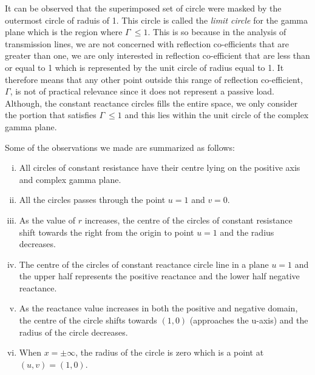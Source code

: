 It can be observed that the superimposed set of circle were masked by the outermost circle of raduis of 1. This circle is called the \emph{limit circle} for the gamma plane which is the region where $\Gamma\ \leq 1$. This is so because in the analysis of transmission lines, we are not concerned with reflection co-efficients that are greater than one, we are only interested in reflection co-efficient that are less than or equal to 1 which is represented by the unit circle of radius equal to 1. It therefore means that any other point outside this range of reflection co-efficient, $\Gamma$, is not of practical relevance since it does not represent a passive load. Although, the constant reactance circles fills the entire space, we only consider the portion that satisfies $ \Gamma\ \leq 1$ and this lies within the unit circle of the complex gamma plane.

Some of the observations we made are summarized as follows:
\begin{enumerate}[(i)]
\item All circles of constant resistance have their centre lying on the positive axis and complex gamma plane.
\item All the circles passes through the point $u = 1$ and $v = 0$.
\item As the value of $r$ increases, the centre of the circles of constant resistance shift towards the right from the origin to point $u = 1$ and the radius decreases.
\item The centre of the circles of constant reactance circle line in a plane $u = 1$ and the upper half represents the positive reactance and the lower half negative reactance.
\item As the reactance value increases in both the positive and negative domain, the centre of the circle shifts towards $(1, 0)$ (approaches the u-axis) and the radius of the circle decreases.
\item When $x = \pm\infty$, the radius of the circle is zero which is a point at $(u,v) = (1,0)$.
\end{enumerate}

